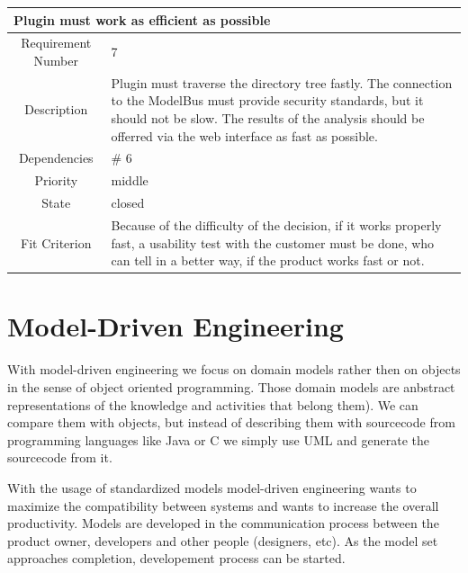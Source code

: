 \noindent\begin{minipage}{\linewidth}
\centering
\begin{tabular}{|c|p{10cm}|}
\hline 
\multicolumn{2}{|l|}{\textbf{Plugin must work as efficient as possible}} \\ 
\hline 
Requirement Number & 7 \\ \hline 
Description & Plugin must traverse the directory tree fastly. The connection to the ModelBus must provide security standards, but it should not be slow. The results of the analysis should be offerred via the web interface as fast as possible. \\ \hline 
Dependencies & \# 6 \\ \hline 
Priority & middle \\ \hline 
State & closed \\ \hline 
Fit Criterion & Because of the difficulty of the decision, if it works properly fast, a usability test with the customer must be done, who can tell in a better way, if the product works fast or not. \\ \hline 
\end{tabular}
\end{minipage}

\section{Model-Driven Engineering}
With model-driven engineering we focus on domain models rather then on objects in the sense of object oriented programming. Those domain models are anbstract representations of the knowledge and activities that belong them). We can compare them with objects, but instead of describing them with sourcecode from programming languages like Java or C we simply use UML and generate the sourcecode from it.

With the usage of standardized models model-driven engineering wants to maximize the compatibility between systems and wants to increase the overall productivity. Models are developed in the communication process between the product owner, developers and other people (designers, etc). As the model set approaches completion, developement process can be started.

